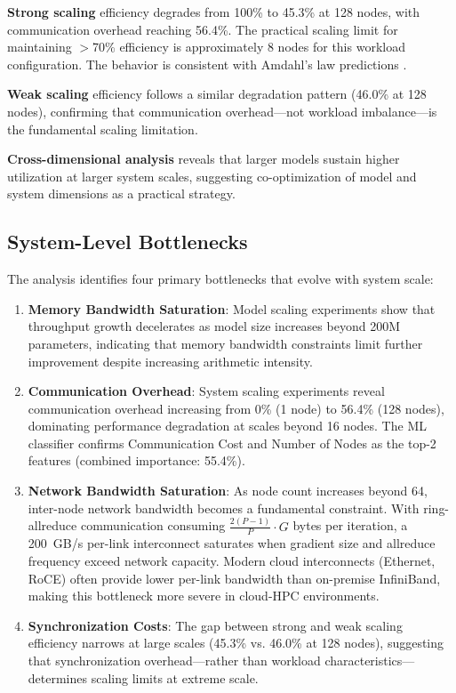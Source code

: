 \documentclass{llncs}
\begin{document}
\textbf{Strong scaling} efficiency degrades from 100\% to 45.3\% at 128 nodes, with communication overhead reaching 56.4\%. The practical scaling limit for maintaining $>$70\% efficiency is approximately 8 nodes for this workload configuration. The behavior is consistent with Amdahl's law predictions \cite{Amdahl1967}.

\textbf{Weak scaling} efficiency follows a similar degradation pattern (46.0\% at 128 nodes), confirming that communication overhead---not workload imbalance---is the fundamental scaling limitation.

\textbf{Cross-dimensional analysis} reveals that larger models sustain higher utilization at larger system scales, suggesting co-optimization of model and system dimensions as a practical strategy.

\subsection{System-Level Bottlenecks}

The analysis identifies four primary bottlenecks that evolve with system scale:

\begin{enumerate}
    \item \textbf{Memory Bandwidth Saturation}: Model scaling experiments show that throughput growth decelerates as model size increases beyond 200M parameters, indicating that memory bandwidth constraints limit further improvement despite increasing arithmetic intensity.

    \item \textbf{Communication Overhead}: System scaling experiments reveal communication overhead increasing from 0\% (1 node) to 56.4\% (128 nodes), dominating performance degradation at scales beyond 16 nodes. The ML classifier confirms Communication Cost and Number of Nodes as the top-2 features (combined importance: 55.4\%).

    \item \textbf{Network Bandwidth Saturation}: As node count increases beyond 64, inter-node network bandwidth becomes a fundamental constraint. With ring-allreduce communication consuming $\frac{2(P-1)}{P} \cdot G$ bytes per iteration, a 200~GB/s per-link interconnect saturates when gradient size and allreduce frequency exceed network capacity. Modern cloud interconnects (Ethernet, RoCE) often provide lower per-link bandwidth than on-premise InfiniBand, making this bottleneck more severe in cloud-HPC environments.

    \item \textbf{Synchronization Costs}: The gap between strong and weak scaling efficiency narrows at large scales (45.3\% vs. 46.0\% at 128 nodes), suggesting that synchronization overhead---rather than workload characteristics---determines scaling limits at extreme scale.
\end{enumerate}
\end{document}
